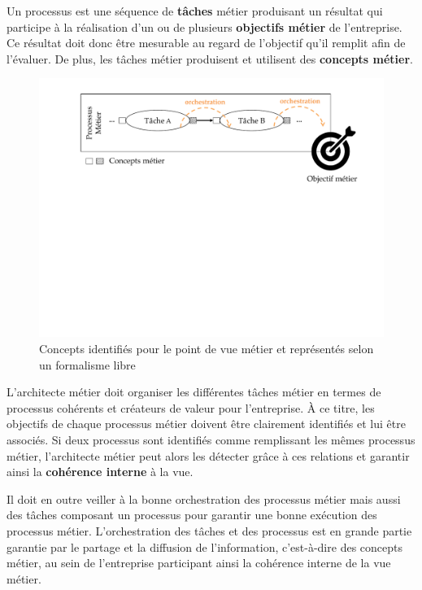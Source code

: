     Un processus est une séquence
    de \textbf{tâches} métier produisant un résultat qui
    participe à la réalisation d'un ou de plusieurs \textbf{objectifs métier} de l'entreprise.
    Ce résultat doit donc être mesurable au regard de l'objectif qu'il remplit afin de l'évaluer.
    De plus, les tâches métier produisent et utilisent des \textbf{concepts métier}.


    \begin{figure}[!ht]
     \begin{center}
     \includegraphics[trim= 0cm 11cm 0cm 0cm, width=1\textwidth]{figures/4_demarche/concepts_vue_metier.pdf} \end{center}
     \caption{Concepts identifiés pour le point de vue métier et représentés selon un formalisme libre}
     \label{fig:concepts_vue_metier}
    \end{figure}

    L'architecte métier doit organiser les différentes tâches métier en
    termes de processus cohérents et créateurs de valeur pour l'entreprise. À ce titre, les objectifs de chaque processus
    métier doivent être clairement identifiés et lui être associés.
    Si deux processus sont identifiés comme remplissant les mêmes processus métier, l'architecte métier
    peut alors les détecter grâce à ces relations et garantir ainsi la \textbf{cohérence interne }à la vue.

    Il doit en outre veiller à la bonne orchestration des processus métier
    mais aussi des tâches composant un processus pour garantir une bonne exécution des processus métier.
    L'orchestration des tâches et des processus est en grande partie garantie par le partage
    et la diffusion de l'information, c'est-à-dire des concepts métier, au sein de l'entreprise participant ainsi la cohérence
    interne de la vue métier.


